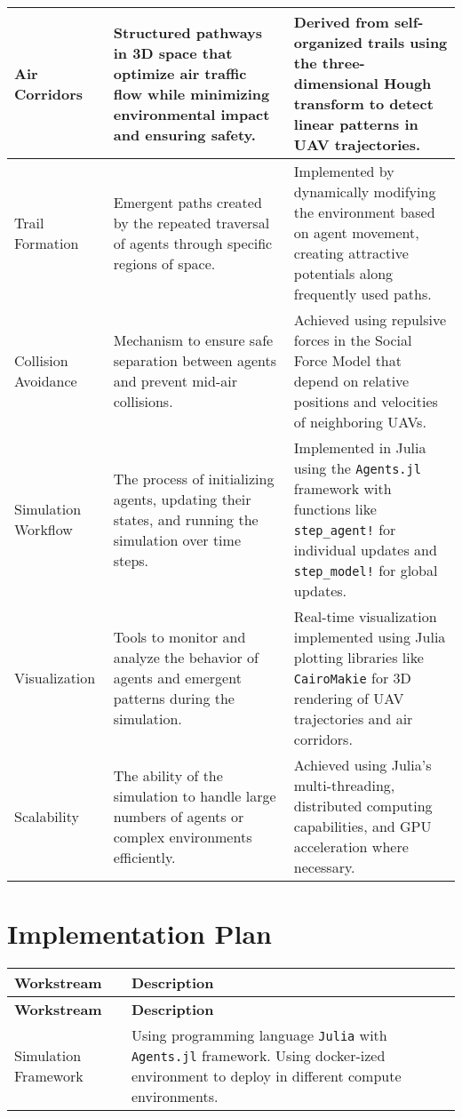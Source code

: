 \documentclass[letterpaper,11pt]{article}
\begin{document}
\begin{longtable}{|p{}|p{}|p{}|}
    Air Corridors & Structured pathways in 3D space that optimize air traffic flow while minimizing environmental impact and ensuring safety. & Derived from self-organized trails using the three-dimensional Hough transform to detect linear patterns in UAV trajectories. \\ \hline
    
    Trail Formation & Emergent paths created by the repeated traversal of agents through specific regions of space. & Implemented by dynamically modifying the environment based on agent movement, creating attractive potentials along frequently used paths. \\ \hline
    
    Collision Avoidance & Mechanism to ensure safe separation between agents and prevent mid-air collisions. & Achieved using repulsive forces in the Social Force Model that depend on relative positions and velocities of neighboring UAVs. \\ \hline
    
    Simulation Workflow & The process of initializing agents, updating their states, and running the simulation over time steps. & Implemented in Julia using the \texttt{Agents.jl} framework with functions like \texttt{step\_agent!} for individual updates and \texttt{step\_model!} for global updates. \\ \hline
    
    Visualization & Tools to monitor and analyze the behavior of agents and emergent patterns during the simulation. & Real-time visualization implemented using Julia plotting libraries like \texttt{CairoMakie} for 3D rendering of UAV trajectories and air corridors. \\ \hline
    
    Scalability & The ability of the simulation to handle large numbers of agents or complex environments efficiently. & Achieved using Julia's multi-threading, distributed computing capabilities, and GPU acceleration where necessary. \\ \hline
    
\end{longtable}



\section{Implementation Plan}
\begin{longtable}{|p{}|p{}|}
    \hline
    \textbf{Workstream} & \textbf{Description}  \\ \hline
    \endfirsthead
    \hline
    \textbf{Workstream} & \textbf{Description} \\ \hline
    \endhead
    \hline
    \endfoot

Simulation Framework & Using programming language \texttt{Julia} with \texttt{Agents.jl} framework. Using docker-ized environment to deploy in different compute environments. \\ \hline


\end{longtable}

\nocite{*} %


\end{document}
